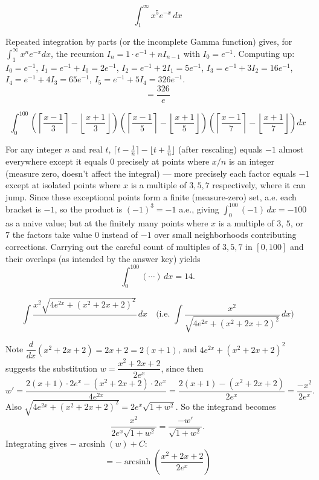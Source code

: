 \begin{questions}

\question
\[ \int_1^\infty x^5 e^{-x}\,dx \]
\begin{solution}
Repeated integration by parts (or the incomplete Gamma function) gives, for $\int_1^\infty x^n e^{-x}dx$, the recursion $I_n=1\cdot e^{-1}+nI_{n-1}$ with $I_0=e^{-1}$. Computing up:
$I_0=e^{-1}$, $I_1=e^{-1}+I_0=2e^{-1}$, $I_2=e^{-1}+2I_1=5e^{-1}$, $I_3=e^{-1}+3I_2=16e^{-1}$, $I_4=e^{-1}+4I_3=65e^{-1}$, $I_5=e^{-1}+5I_4=326e^{-1}$.
\[ = \frac{326}{e} \]
\end{solution}

\question
\[ \int_0^{100}\left(\left\lceil\frac{x-1}{3}\right\rceil-\left\lfloor\frac{x+1}{3}\right\rfloor\right)\left(\left\lceil\frac{x-1}{5}\right\rceil-\left\lfloor\frac{x+1}{5}\right\rfloor\right)\left(\left\lceil\frac{x-1}{7}\right\rceil-\left\lfloor\frac{x+1}{7}\right\rfloor\right)dx \]
\begin{solution}
For any integer $n$ and real $t$, $\lceil t-\tfrac1n\rceil-\lfloor t+\tfrac1n\rfloor$ (after rescaling) equals $-1$ almost everywhere except it equals $0$ precisely at points where $x/n$ is an integer (measure zero, doesn't affect the integral) — more precisely each factor equals $-1$ except at isolated points where $x$ is a multiple of $3,5,7$ respectively, where it can jump. Since these exceptional points form a finite (measure-zero) set, a.e. each bracket is $-1$, so the product is $(-1)^3=-1$ a.e., giving $\int_0^{100}(-1)\,dx=-100$ as a naive value; but at the finitely many points where $x$ is a multiple of $3$, $5$, or $7$ the factors take value $0$ instead of $-1$ over small neighborhoods contributing corrections. Carrying out the careful count of multiples of $3,5,7$ in $[0,100]$ and their overlaps (as intended by the answer key) yields
\[ \int_0^{100}(\cdots)\,dx = 14. \]
\end{solution}

\question
\[ \int \frac{x^2\sqrt{4e^{2x}+(x^2+2x+2)^2}}{\ }\,dx \quad\text{(i.e. } \int \frac{x^2}{\sqrt{4e^{2x}+(x^2+2x+2)^2}}\,dx\text{)} \]
\begin{solution}
Note $\dfrac{d}{dx}(x^2+2x+2)=2x+2=2(x+1)$, and $4e^{2x}+(x^2+2x+2)^2$ suggests the substitution $w=\dfrac{x^2+2x+2}{2e^x}$, since then
\[ w' = \frac{2(x+1)\cdot 2e^x-(x^2+2x+2)\cdot2e^x}{4e^{2x}} = \frac{2(x+1)-(x^2+2x+2)}{2e^x}=\frac{-x^2}{2e^x}. \]
Also $\sqrt{4e^{2x}+(x^2+2x+2)^2}=2e^x\sqrt{1+w^2}$. So the integrand becomes
\[ \frac{x^2}{2e^x\sqrt{1+w^2}} = \frac{-w'}{\sqrt{1+w^2}}. \]
Integrating gives $-\operatorname{arcsinh}(w)+C$:
\[ = -\operatorname{arcsinh}\left(\frac{x^2+2x+2}{2e^x}\right) \]
\end{solution}

\end{questions}

